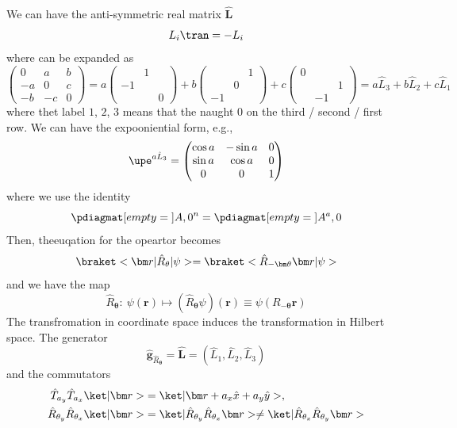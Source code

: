 We can have the anti-symmetric real matrix $\hat{\bm L}$
\begin{equation}
  L_i\tran = -L_i
\end{equation}
where can be expanded as
\begin{equation}
  \begin{pmatrix}
    0 & a & b\\
    -a & 0 & c\\
    -b & -c & 0
  \end{pmatrix} = a
  \begin{pmatrix}
    & 1\\-1\\ & & 0
  \end{pmatrix} + b
  \begin{pmatrix}
    & & 1\\ & 0\\ -1
  \end{pmatrix} + c
  \begin{pmatrix}
    0\\ & & 1\\ & -1
  \end{pmatrix}
  = a \hat L_3 + b \hat L_2 + c \hat L_1
\end{equation}
where thet label $1$, $2$, $3$ means that the naught $0$ on the third / second /
first row.
We can have the expooniential form, e.g.,
\[
  \upe^{a\hat L_3} =
  \begin{pmatrix}
    \cos a & -\sin a & 0\\
    \sin a & \cos a & 0\\
    0 & 0 & 1
  \end{pmatrix}
\]
where we use the identity
\[
  \pdiagmat[empty = {}]{A,0}^n = \pdiagmat[empty = {}]{A^a,0}
\]
Then, theeuqation for the opeartor becomes
\begin{equation}
  \braket<\bm r|\hat R_\theta|\psi> = \braket<\hat R_{-\bm\theta} \bm r|\psi>
\end{equation}
and we have the map
\begin{equation}
  \hat R_{\bm \theta}:\
  \psi(\bm r) \longmapsto (\hat R_{\bm\theta} \psi) (\bm r)
\equiv \psi(R_{-\bm\theta} \bm r)
\end{equation}
The transfromation in coordinate space induces the transformation in
Hilbert space. The generator
\[
  \hat{\bm g}_{\hat R_{\bm\theta}} = \hat{\bm L}
= (\hat L_1, \hat L_2, \hat L_3)
\]
and the commutators
\begin{align}
  \hat T_{a_y} \hat T_{a_x} \ket|\bm r> &
= \ket|\bm r + a_x\hat x + a_y \hat y>,\\
  \hat R_{\theta_y} \hat R_{\theta_x} \ket|\bm r> &
= \ket|\hat R_{\theta_y} \hat R_{\theta_x} \bm r>
\neq \ket|\hat R_{\theta_x} \hat R_{\theta_y} \bm r>
\end{align}

